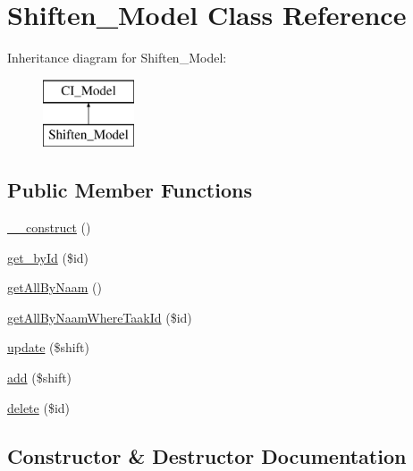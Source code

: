 \hypertarget{class_shiften___model}{}\section{Shiften\+\_\+\+Model Class Reference}
\label{class_shiften___model}
Inheritance diagram for Shiften\+\_\+\+Model\+:\begin{figure}[H]
\begin{center}
\leavevmode
\includegraphics[height=2.000000cm]{class_shiften___model}
\end{center}
\end{figure}
\subsection*{Public Member Functions}
\begin{DoxyCompactItemize}
\item 
\mbox{\hyperlink{class_shiften___model_a095c5d389db211932136b53f25f39685}{\+\_\+\+\_\+construct}} ()
\item 
\mbox{\hyperlink{class_shiften___model_a98d28a4d9a29d40c5a8aa0176f19a919}{get\+\_\+by\+Id}} (\$id)
\item 
\mbox{\hyperlink{class_shiften___model_a2b035b1ffd1cbe651b35bb3e53d72c09}{get\+All\+By\+Naam}} ()
\item 
\mbox{\hyperlink{class_shiften___model_a537c83774b71a66979239cdffbb584d4}{get\+All\+By\+Naam\+Where\+Taak\+Id}} (\$id)
\item 
\mbox{\hyperlink{class_shiften___model_a0275d30c0139203609e59da92dc43790}{update}} (\$shift)
\item 
\mbox{\hyperlink{class_shiften___model_a3fc76f85c3f3f387825bd98a099eb973}{add}} (\$shift)
\item 
\mbox{\hyperlink{class_shiften___model_a2f8258add505482d7f00ea26493a5723}{delete}} (\$id)
\end{DoxyCompactItemize}


\subsection{Constructor \& Destructor Documentation}
\mbox{\label{class_shiften___model_a095c5d389db211932136b53f25f39685}} 
